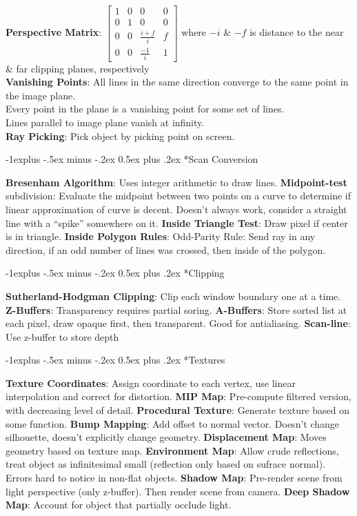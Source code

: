\documentclass[3pt,landscape]{article}
\makeatletter
\renewcommand{\subsection}{\@startsection{subsection}{2}{0mm}%
                            {-1explus -.5ex minus -.2ex}%
                            {0.5ex plus .2ex}%
                            {\normalfont\normalsize\bfseries}}
\makeatother
\begin{document}
\begin{multicols}{3}
{\bf Perspective Matrix}: \(\begin{bmatrix}
1 & 0 & 0 & 0 \\
0 & 1 & 0 & 0 \\
0 & 0 & \frac{i+f}{i} & f \\
0 & 0 & \frac{-1}{i} & 1
\end{bmatrix}\) where \(-i\) \& \(-f\) is distance to the near \& far clipping planes, respectively\\
{\bf Vanishing Points}: All lines in the same direction converge to the same point in the image plane.\\
Every point in the plane is a vanishing point for some set of lines.\\
Lines parallel to image plane vanish at infinity.\\
{\bf Ray Picking}: Pick object by picking point on screen.


\subsection*{Scan Conversion}

{\bf Bresenham Algorithm}: Uses integer arithmetic to draw lines.
{\bf Midpoint-test} subdivision: Evaluate the midpoint between two points on a curve to determine if linear approximation of curve is decent. Doesn't always work, consider a straight line with a ``spike'' somewhere on it.
{\bf Inside Triangle Test}: Draw pixel if center is in triangle.
{\bf Inside Polygon Rules}: Odd-Parity Rule: Send ray in any direction, if an odd number of lines was crossed, then inside of the polygon.

\subsection*{Clipping}

{\bf Sutherland-Hodgman Clipping}: Clip each window boundary one at a time.
{\bf Z-Buffers}: Transparency requires partial soring.
{\bf A-Buffers}: Store sorted list at each pixel, draw opaque first, then transparent. Good for antialiasing.
{\bf Scan-line}: Use z-buffer to store depth

\subsection*{Textures}

{\bf Texture Coordinates}: Assign coordinate to each vertex, use linear interpolation and correct for distortion.
{\bf MIP Map}: Pre-compute filtered version, with decreasing level of detail.
{\bf Procedural Texture}: Generate texture based on some function.
{\bf Bump Mapping}: Add offset to normal vector. Doesn't change silhouette, doesn't explicitly change geometry.
{\bf Displacement Map}: Moves geometry based on texture map.
{\bf Environment Map}: Allow crude reflections, treat object as infinitesimal small (reflection only based on sufrace normal). Errors hard to notice in non-flat objects.
{\bf Shadow Map}: Pre-render scene from light perspective (only z-buffer). Then render scene from camera.
{\bf Deep Shadow Map}: Account for object that partially occlude light.


\end{multicols}
\end{document}

